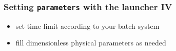 \documentclass[9pt]{beamer}
\begin{document}
{
\begin{frame}[fragile]
  \frametitle{Setting {\tt parameters} with the launcher IV}

\vspace{5.25cm}

\begin{block}{}
\begin{itemize}
\item set time limit according to your batch system
\item fill dimensionless physical parameters as needed
\end{itemize}
\end{block}

\end{frame}
}

\end{document}
